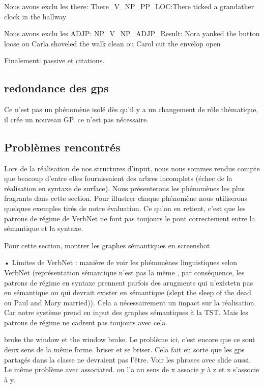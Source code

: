 Nous avons exclu les there: There\_V\_NP\_PP\_LOC:There ticked a grandather clock in the hallway

Nous avons exclu les ADJP: NP\_V\_NP\_ADJP\_Result: Nora yanked the button loose ou Carla shoveled the walk clean ou Carol cut the envelop open

Finalement: passive et citations.

\subsection{redondance des gps}
Ce n'est pas un phénomène isolé dès qu'il y a un changement de rôle thématique, il crée un nouveau GP. ce n'est pas nécessaire.


\subsection{Problèmes rencontrés}

Lors de la réalisation de nos structures d'input, nous nous sommes rendus compte que beacoup d'entre elles fournissaient des arbres incomplets (échec de la réalisation en syntaxe de surface). Nous présenterons les phénomènes les plus fragrants dans cette section. Pour illustrer chaque phénomène nous utiliserons quelques exemples tirés de notre évaluation. Ce qu'on en retient, c'est que les patrons de régime de VerbNet ne font pas toujours le pont correctement entre la sémantique et la syntaxe.

Pour cette section, montrer les graphes sémantiques en screenshot

•	Limites de VerbNet : manière de voir les phénomènes linguistiques selon VerbNet (représentation sémantique n'est pas la même , par conséquence, les patrons de régime en syntaxe prennent parfois des arugments qui n'existetn pas en sémantique ou qui devrait exister en sémantique (slept the sleep of the dead ou Paul and Mary married)). Cela a nécessairement un impact sur la réalisation. Car notre système prend en input des graphes sémantiques à la TST. Mais les patrons de régime ne cadrent pas toujours avec cela.

broke the window et the window broke. Le problème ici, c'est encore que ce sont deux sens de la même forme. briser et se briser. Cela fait en sorte que les gps partagés dans la classe ne devraient pas l'être. Voir les phrases avec slide aussi. Le même problème avec associated. on l'a au sens de x associe y à z et x s'associe à y.

